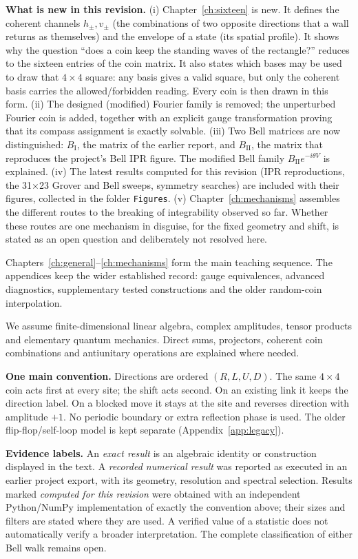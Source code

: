 \documentclass[11pt,a4paper,oneside]{report}
\numberwithin{equation}{chapter}
\begin{document}
\textbf{What is new in this revision.}
(i) Chapter~\ref{ch:sixteen} is new. It defines the coherent channels
\(h_\pm,v_\pm\) (the combinations of two opposite directions that a wall
returns as themselves) and the envelope of a state (its spatial profile).
It shows why the question ``does a coin keep the standing waves of the
rectangle?'' reduces to the sixteen entries of the coin matrix. It also
states which bases may be used to draw that \(4\times4\) square: any
basis gives a valid square, but only the coherent basis carries the
allowed/forbidden reading. Every coin is then drawn in this form.
(ii) The designed (modified) Fourier family is removed; the unperturbed
Fourier coin is added, together with an explicit gauge transformation
proving that its compass assignment is exactly solvable.
(iii) Two Bell matrices are now distinguished: \(B_{\mathrm I}\), the
matrix of the earlier report, and \(B_{\mathrm{II}}\), the matrix that
reproduces the project's Bell IPR figure. The modified Bell family
\(B_{\mathrm{II}}e^{-i\theta V}\) is explained.
(iv) The latest results computed for this revision (IPR reproductions, the 31\(\times\)23
Grover and Bell sweeps, symmetry searches) are included with their
figures, collected in the folder \texttt{Figures}.
(v) Chapter~\ref{ch:mechanisms} assembles the different routes to the
breaking of integrability observed so far. Whether these routes are one
mechanism in disguise, for the fixed geometry and shift, is stated as an
open question and deliberately not resolved here.

Chapters~\ref{ch:general}--\ref{ch:mechanisms} form the main teaching
sequence. The appendices keep the wider established record: gauge
equivalences, advanced diagnostics, supplementary tested constructions
and the older random-coin interpolation.

We assume finite-dimensional linear algebra, complex amplitudes, tensor
products and elementary quantum mechanics. Direct sums, projectors,
coherent coin combinations and antiunitary operations are explained where
needed.

\textbf{One main convention.} Directions are ordered \((R,L,U,D)\).
The same \(4\times4\) coin acts first at every site; the shift acts
second. On an existing link it keeps the direction label. On a blocked
move it stays at the site and reverses direction with amplitude \(+1\).
No periodic boundary or extra reflection phase is used. The older
flip-flop/self-loop model is kept separate (Appendix~\ref{app:legacy}).

\textbf{Evidence labels.} An \emph{exact result} is an algebraic identity
or construction displayed in the text. A \emph{recorded numerical result}
was reported as executed in an earlier project export, with its geometry,
resolution and spectral selection. Results marked \emph{computed for this revision} were obtained with an
independent Python/NumPy implementation of exactly the convention above;
their sizes and filters are stated where they are used. A verified value of a statistic does not
automatically verify a broader interpretation. The complete
classification of either Bell walk remains open.
\end{document}
